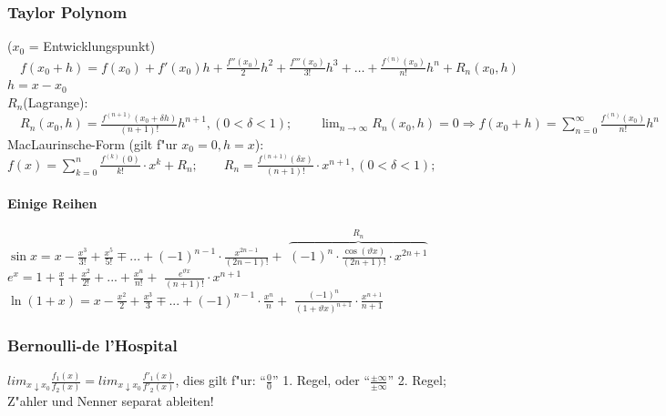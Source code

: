 \subsubsection{Taylor Polynom }
	($x_0$ = Entwicklungspunkt)$\quad f(x_0+h)=f(x_0) + f'(x_0)h + \frac{f''(x_0)}{2}h^2 + \frac{f'''(x_0)}{3!}h^3 + \ldots + \frac{f^{(n)}(x_0)}{n!}h^n + R_n(x_0, h)$\\
	$ h = x-x_0$\\
	$R_n$(Lagrange):$\quad R_n(x_0, h) = \frac{f^{(n+1)}(x_0 + \delta h)}{(n+1)!}h^{n+1}, (0 < \delta < 1);
	\qquad 
	\lim_{n \to \infty} R_n(x_0, h) = 0 \Longrightarrow f(x_0+h) = \sum\limits_{n=0}^{\infty} \frac{f^{(n)}(x_0)}{n!}h^n$\\	
	\flushleft MacLaurinsche-Form (gilt f"ur $x_0=0, h=x $): $ f(x)=\sum\limits_{k=0}^{n} \frac{f^{(k)}(0)}{k!} \cdot x^k + R_n; 
	\qquad 
	R_n = \frac{f^{(n+1)}(\delta x)}{(n+1)!} \cdot x^{n+1}, (0 < \delta < 1);$
	
\paragraph{Einige Reihen}
		$\sin x = x - \frac{x^3}{3!} +  \frac{x^5}{5!} \mp ... + (-1)^{n-1} \cdot \frac{x^{2n-1}}{(2n-1)!} + $
		$ \overbrace{(-1)^n \cdot \frac{\cos(\vartheta x)}{(2n+1)!} \cdot x^{2n+1}}^{R_n} $\\
		$e^x =  1 + \frac{x}{1} + \frac{x^2}{2!} + ... + \frac{x^n}{n!} + $
		$ \frac{e^{\vartheta x}}{(n+1)!} \cdot x^{n+1} $\\
		$\ln (1+x) = x - \frac{x^2}{2} + \frac{x^3}{3} \mp ... + (-1)^{n-1} \cdot \frac{x^n}{n} + $
		$ \frac{(-1)^n}{(1+\vartheta x)^{n+1}} \cdot \frac{x^{n+1}}{n+1} $ 

\subsubsection{Bernoulli-de l'Hospital }
	${lim} _{x\downarrow x_{0}} \frac{f_{1}(x)}{f_{2}(x)} = {lim} _{x\downarrow x_{0}} \frac{f'_{1}(x)}{f'_{2}(x)} $, dies gilt f"ur: "`$\frac{0}{0}$"' 1. Regel, oder "`$\frac{\pm\infty}{\pm\infty}$"' 2. Regel;   Z"ahler und Nenner separat ableiten!


